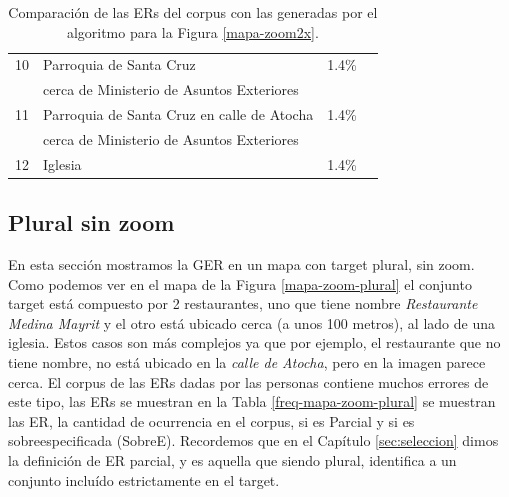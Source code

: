 \begin{table}[H]
{\begin{center}
\begin{tabular}{|l|l|c|c|}
10&Parroquia de Santa Cruz  				               &    1.4\%	&\\  
&cerca de Ministerio de Asuntos Exteriores		           &	  		&\\  \hline
11&Parroquia de Santa Cruz en calle de Atocha  		       &	1.4\%	&\\  
&cerca de Ministerio de Asuntos Exteriores		   	       &	    	&\\  \hline
12&Iglesia						                           &    1.4\%	&\\  \hline
\end{tabular}
\caption{Comparaci\'on de las ERs del corpus con las generadas por el algoritmo para la Figura \ref{mapa-zoom2x}.}\label{compara-mapa-zoom2x}
\end{center}
}
\end{table}



\subsection{Plural sin zoom}
\label{sec:plural}


En esta secci\'on mostramos la GER en un mapa con target plural, sin zoom. Como podemos ver en el mapa de la Figura \ref{mapa-zoom-plural} el conjunto target est\'a compuesto por 2 restaurantes, uno que tiene nombre {\it Restaurante Medina Mayrit} y el otro est\'a ubicado cerca (a unos 100 metros), al lado de una iglesia. Estos casos son m\'as complejos ya que por ejemplo, el restaurante que no tiene nombre, no est\'a ubicado en la {\it calle de Atocha}, pero en la imagen parece cerca. El corpus de las ERs dadas por las personas contiene muchos errores de este tipo, las ERs se muestran en la Tabla \ref{freq-mapa-zoom-plural} se muestran las ER, la cantidad de ocurrencia en el corpus, si es Parcial y si es sobreespecificada (SobreE). 
Recordemos que en el Cap\'itulo \ref{sec:seleccion} dimos la definici\'on de ER parcial, y es aquella que siendo plural, identifica a un conjunto inclu\'ido estrictamente en el target.


